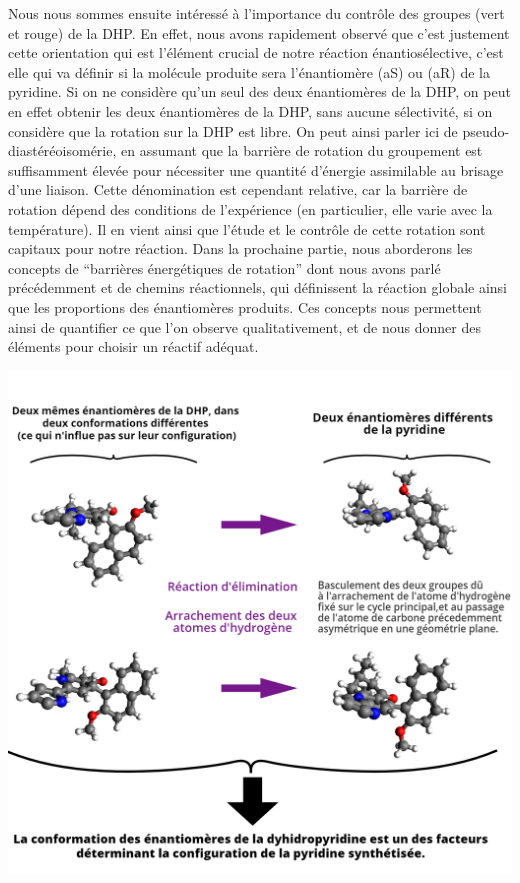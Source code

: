 \documentclass{article}
\begin{document}
Nous nous sommes ensuite intéressé à l’importance du contrôle des groupes (vert et rouge) de la DHP. En effet, nous avons rapidement observé que c’est justement cette orientation qui est l’élément crucial de notre réaction énantiosélective, c’est elle qui va définir si la molécule produite sera l’énantiomère (aS) ou (aR) de la pyridine.
\medbreak
Si on ne considère qu’un seul des deux énantiomères de la DHP, on peut en effet obtenir les deux énantiomères de la DHP, sans aucune sélectivité, si on considère que la rotation sur la DHP est libre.
On peut ainsi parler ici de pseudo-diastéréoisomérie, en assumant que la barrière de rotation du groupement est suffisamment élevée pour nécessiter une quantité d'énergie assimilable au brisage d’une liaison. Cette dénomination est cependant relative, car la barrière de rotation dépend des conditions de l’expérience (en particulier, elle varie avec la température).
\medbreak
Il en vient ainsi que l’étude et le contrôle de cette rotation sont capitaux pour notre réaction. Dans la prochaine partie, nous aborderons les concepts de “barrières énergétiques de rotation” dont nous avons parlé précédemment et de chemins réactionnels, qui définissent la réaction globale ainsi que les proportions des énantiomères produits. Ces concepts nous permettent ainsi de quantifier ce que l’on observe qualitativement, et de nous donner des éléments pour choisir un réactif adéquat.
\begin{center}
\includegraphics[scale = 0.35]{c}
\end{center}
\newpage
\end{document}
